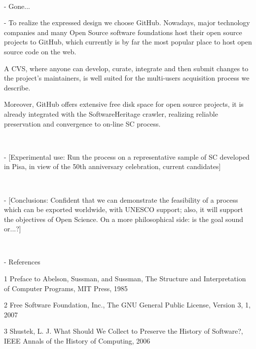 \documentclass[a4paper]{article}
\begin{document}
\

 - Gone...
\

 - To realize the expressed design we choose GitHub. Nowadays, major technology companies and many Open Source software foundations host their open source projects to GitHub, which currently is by far the most popular place to host open source code on the web.

A CVS, where anyone can develop, curate, integrate and then submit changes to the project's maintainers, is well suited for the multi-users acquisition process we describe.

Moreover, GitHub offers extensive free disk space for open source projects, it is already integrated with the SoftwareHeritage crawler, realizing reliable preservation and convergence to on-line SC process.

\

 - [Experimental use: Run the process on a representative sample of SC developed in Pisa, in view of the 50th anniversary celebration, current candidates]

\

 - [Conclusions: Confident that we can demonstrate the feasibility of a process which can be exported worldwide, with UNESCO support; also, it will support the objectives of Open Science. On a more philosophical side: is the goal sound or...?] 

\

 - References 

  1     Preface to Abelson, Sussman, and Sussman, The Structure and     Interpretation of Computer Programs, MIT Press, 1985
	
  2     Free Software Foundation, Inc., The GNU General Public License,     Version 3, 1, 2007
	
  3     Shustek, L. J. What Should We Collect to Preserve the History of     Software?, IEEE Annals of the History of Computing, 2006
\end{document}
